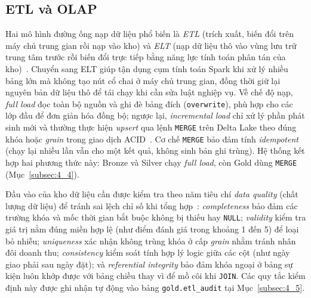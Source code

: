 \documentclass[a4paper]{article}
\begin{document}
\subsection{ETL và OLAP}
\label{subsec:2_3}

Hai mô hình đường ống nạp dữ liệu phổ biến là \textit{ETL} (trích xuất, biến đổi trên máy chủ trung gian rồi nạp vào kho) và \textit{ELT} (nạp dữ liệu thô vào vùng lưu trữ trung tâm trước rồi biến đổi trực tiếp bằng năng lực tính toán phân tán của kho)~\cite{bib:kimball2013,bib:databricks}. Chuyển sang ELT giúp tận dụng cụm tính toán Spark khi xử lý nhiều bảng lớn mà không tạo nút cổ chai ở máy chủ trung gian, đồng thời giữ lại nguyên bản dữ liệu thô để tái chạy khi cần sửa luật nghiệp vụ. Về chế độ nạp, \textit{full load} đọc toàn bộ nguồn và ghi đè bảng đích (\texttt{overwrite}), phù hợp cho các lớp đầu để đơn giản hóa đồng bộ; ngược lại, \textit{incremental load} chỉ xử lý phần phát sinh mới và thường thực hiện \textit{upsert} qua lệnh \texttt{MERGE} trên Delta Lake theo đúng khóa hoặc \textit{grain} trong giao dịch ACID~\cite{bib:databricks}. Cơ chế \texttt{MERGE} bảo đảm tính \textit{idempotent} (chạy lại nhiều lần vẫn cho một kết quả, không sinh bản ghi trùng). Hệ thống kết hợp hai phương thức này: Bronze và Silver chạy \textit{full load}, còn Gold dùng \texttt{MERGE} (Mục~\ref{subsec:4_4}).

Đầu vào của kho dữ liệu cần được kiểm tra theo năm tiêu chí \textit{data quality} (chất lượng dữ liệu) để tránh sai lệch chỉ số khi tổng hợp~\cite{bib:kimball2013}: \textit{completeness} bảo đảm các trường khóa và mốc thời gian bắt buộc không bị thiếu hay \texttt{NULL}; \textit{validity} kiểm tra giá trị nằm đúng miền hợp lệ (như điểm đánh giá trong khoảng 1 đến 5) để loại bỏ nhiễu; \textit{uniqueness} xác nhận không trùng khóa ở cấp \textit{grain} nhằm tránh nhân đôi doanh thu; \textit{consistency} kiểm soát tính hợp lý logic giữa các cột (như ngày giao phải sau ngày đặt); và \textit{referential integrity} bảo đảm khóa ngoại ở bảng sự kiện luôn khớp được với bảng chiều thay vì để mồ côi khi \texttt{JOIN}. Các quy tắc kiểm định này được ghi nhận tự động vào bảng \texttt{gold.etl\_audit} tại Mục~\ref{subsec:4_5}.
\end{document}
